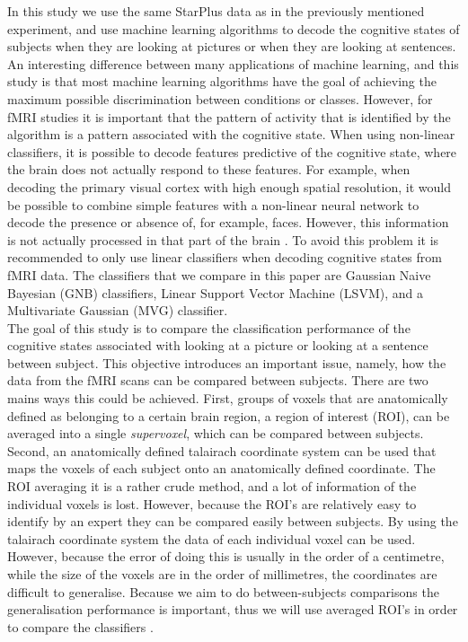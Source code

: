 \documentclass[preprint,journal,11pt]{vgtc}
\begin{document}
In this study we use the same StarPlus data as in the previously mentioned experiment, and use machine learning algorithms to decode the cognitive states of subjects when they are looking at pictures or when they are looking at sentences. An interesting difference between many applications of machine learning, and this study is that most machine learning algorithms have the goal of achieving the maximum possible discrimination between conditions or classes. However, for fMRI studies it is important that the pattern of activity that is identified by the algorithm is a pattern associated with the cognitive state. When using non-linear classifiers, it is possible to decode features predictive of the cognitive state, where the brain does not actually respond to these features. For example, when decoding the primary visual cortex with high enough spatial resolution, it would be possible to combine simple features with a non-linear neural network to decode the presence or absence of, for example, faces. However, this information is not actually processed in that part of the brain \cite{to:2012rev}. To avoid this problem it is recommended to only use linear classifiers when decoding cognitive states from fMRI data. The classifiers that we compare in this paper are Gaussian Naive Bayesian (GNB) classifiers, Linear Support Vector Machine (LSVM), and a Multivariate Gaussian (MVG) classifier.\\
\indent The goal of this study is to compare the classification performance of the cognitive states associated with looking at a picture or looking at a sentence between subject. This objective introduces an important issue, namely, how the data from the fMRI scans can be compared between subjects. There are two mains ways this could be achieved. First, groups of voxels that are anatomically defined as belonging to a certain brain region, a region of interest (ROI), can be averaged into a single \emph{supervoxel}, which can be compared between subjects. Second, an anatomically defined talairach coordinate system can be used that maps the voxels of each subject onto an anatomically defined coordinate. The ROI averaging it is a rather crude method, and a lot of information of the individual voxels is lost. However, because the ROI's are relatively easy to identify by an expert they can be compared easily between subjects. By using the talairach coordinate system the data of each individual voxel can be used. However, because the error of doing this is usually in the order of a centimetre, while the size of the voxels are in the order of millimetres, the coordinates are difficult to generalise. Because we aim to do between-subjects comparisons the generalisation performance is important, thus we will use averaged ROI's in order to compare the classifiers \cite{mi:2004coord}.\\
\end{document}
